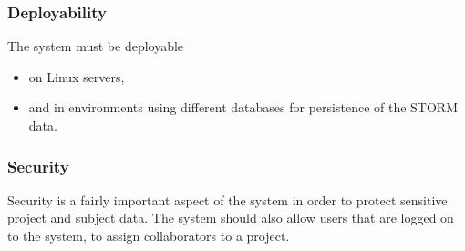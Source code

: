 \subsubsection{Deployability} \label{3.2.5}
The system must be deployable
\begin{itemize}
\item on Linux servers,
\item and in environments using different databases for persistence of the STORM data.
\end{itemize}

\subsubsection{Security} \label{3.2.6}
Security is a fairly important aspect of the system in order to protect sensitive project and subject data.
The system should also allow users that are logged on to the system, to assign collaborators
to a project. 


